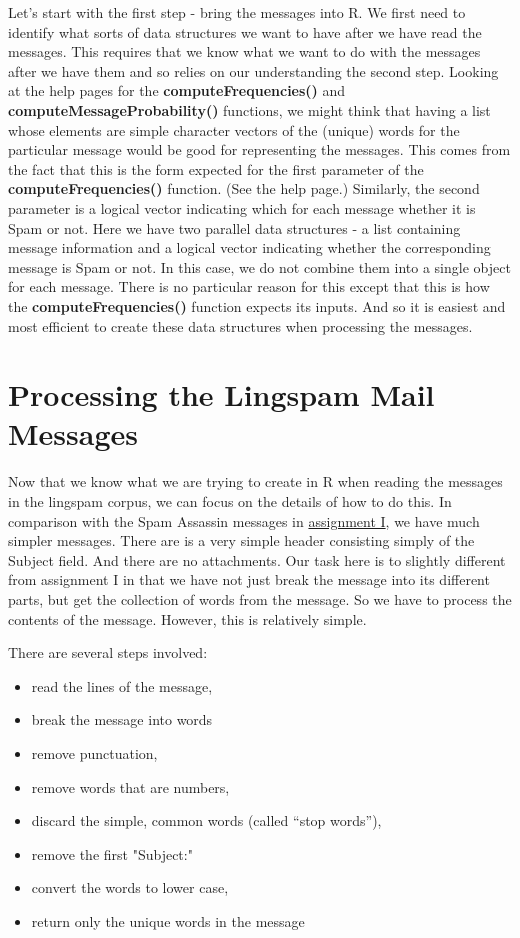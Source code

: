 \documentclass{article}
\def\SFunction#1{\textbf{#1()}}
\def\HREF#1#2{\href{#1}{#2}}
\begin{document}
Let's start with the first step - bring the messages into R.  We first
need to identify what sorts of data structures we want to have after
we have read the messages.  This requires that we know what we want to
do with the messages after we have them and so relies on our
understanding the second step.  Looking at the help pages for the
\SFunction{computeFrequencies} and
\SFunction{computeMessageProbability} functions, we might think that
having a list whose elements are simple character vectors of the
(unique) words for the particular message would be good for
representing the messages.  This comes from the fact that this is the
form expected for the first parameter of the
\SFunction{computeFrequencies} function.  (See the help page.)
Similarly, the second parameter is a logical vector indicating which
for each message whether it is Spam or not.  Here we have two parallel
data structures - a list containing message information and a logical
vector indicating whether the corresponding message is Spam or not.
In this case, we do not combine them into a single object for each
message. There is no particular reason for this except that this is
how the \SFunction{computeFrequencies} function expects its inputs.
And so it is easiest and most efficient to create these data
structures when processing the messages.



\section{Processing the Lingspam Mail Messages}

Now that we know what we are trying to create in R when reading the
messages in the lingspam corpus, we can focus on the details of how to
do this.  In comparison with the Spam Assassin messages in
\HREF{}{assignment I}, we have much simpler messages.  There are is a
very simple header consisting simply of the Subject field.  And there
are no attachments.  Our task here is to slightly different from
assignment I in that we have not just break the message into its
different parts, but get the collection of words from the message.  So
we have to process the contents of the message.
However, this is relatively simple.

There are several steps involved:
\begin{itemize}
\item read the lines of the message,
\item break the message into words
\item remove punctuation,
\item remove words that are numbers,
\item discard the simple, common words (called ``stop words''), 
\item remove the first "Subject:"
\item convert the words to lower case,
\item return only the unique words in the message
\end{itemize}
\end{document}
